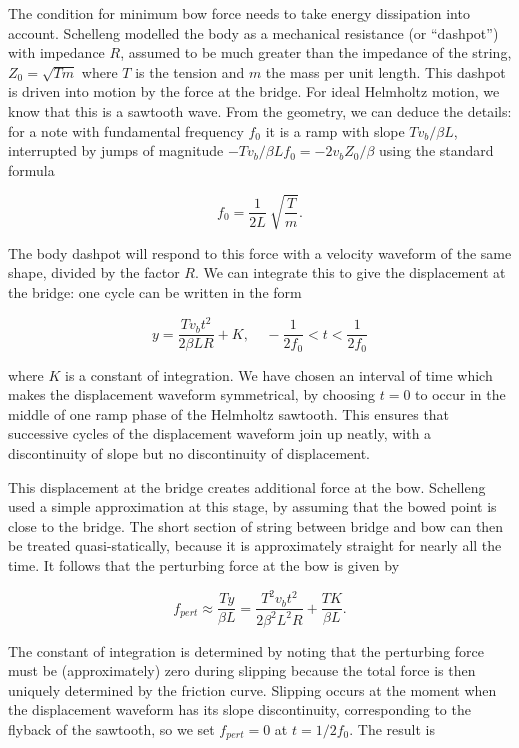   The condition for minimum bow force needs to take energy dissipation into 
  account. Schelleng modelled the body as a mechanical resistance (or 
  ``dashpot'') with impedance $R$, assumed to be much greater than the 
  impedance of the string, $Z_0 = \sqrt{Tm}$ where $T$ is the tension and $m$ 
  the mass per unit length. This dashpot is driven into motion by the force at 
  the bridge. For ideal Helmholtz motion, we know that this is a sawtooth wave. 
  From the geometry, we can deduce the details: for a note with fundamental 
  frequency $f_0$ it is a ramp with slope $Tv_b/\beta L$, interrupted by jumps 
  of magnitude $-Tv_b/\beta L f_0=-2v_b Z_0/\beta$ using the standard formula 

  $$f_0=\dfrac{1}{2L}~\sqrt{\dfrac{T}{m}} . \tag{5}$$ 

  The body dashpot will respond to this force with a velocity waveform of the 
  same shape, divided by the factor $R$. We can integrate this to give the 
  displacement at the bridge: one cycle can be written in the form 

  $$y=\dfrac{T v_b t^2}{2 \beta L R} + K, \mathrm{~~~~~}-\dfrac{1}{2f_0} < t < 
  \dfrac{1}{2f_0} \tag{6}$$ 

  where $K$ is a constant of integration. We have chosen an interval of time 
  which makes the displacement waveform symmetrical, by choosing $t=0$ to occur 
  in the middle of one ramp phase of the Helmholtz sawtooth. This ensures that 
  successive cycles of the displacement waveform join up neatly, with a 
  discontinuity of slope but no discontinuity of displacement. 

  This displacement at the bridge creates additional force at the bow. 
  Schelleng used a simple approximation at this stage, by assuming that the 
  bowed point is close to the bridge. The short section of string between 
  bridge and bow can then be treated quasi-statically, because it is 
  approximately straight for nearly all the time. It follows that the 
  perturbing force at the bow is given by 

  $$f_{pert} \approx \dfrac{Ty}{\beta L} = \dfrac{T^2 v_b t^2}{2 \beta^2 L^2 R} 
  + \dfrac{TK}{\beta L} . \tag{7}$$ 

  The constant of integration is determined by noting that the perturbing force 
  must be (approximately) zero during slipping because the total force is then 
  uniquely determined by the friction curve. Slipping occurs at the moment when 
  the displacement waveform has its slope discontinuity, corresponding to the 
  flyback of the sawtooth, so we set $f_{pert}=0$ at $t=1/2f_0$. The result is 


